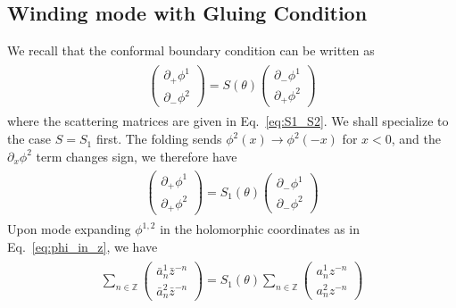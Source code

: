 \subsection{Winding mode with Gluing Condition}
\label{app_sub:compact_gluing_boundary}


We recall that the conformal boundary condition can be written as
\begin{eqnarray}\begin{aligned}
\label{eq:def_S_in_app}
\begin{pmatrix}
\partial_+\phi^1\\
\partial_-\phi^2
\end{pmatrix}
=S(\theta)
\begin{pmatrix}
\partial_-\phi^1\\
\partial_+\phi^2
\end{pmatrix}
\end{aligned}\end{eqnarray}
where the scattering matrices are given in Eq.~\eqref{eq:S1_S2}. We shall specialize to the case $S=S_1$ first. The folding sends $\phi^2(x)\rightarrow\phi^2(-x)$ for $x<0$, and the $\partial_x\phi^2$ term changes sign, we therefore have 
\begin{eqnarray}\begin{aligned}
\label{eq:def_S_in_app_2}
\begin{pmatrix}
\partial_+\phi^1\\
\partial_+\phi^2
\end{pmatrix}
=S_1(\theta)
\begin{pmatrix}
\partial_-\phi^1\\
\partial_-\phi^2
\end{pmatrix}
\end{aligned}\end{eqnarray}
Upon mode expanding $\phi^{1,2}$ in the holomorphic coordinates as in Eq.~\eqref{eq:phi_in_z}, we have
\begin{eqnarray}\begin{aligned}
\label{eq:def_S_in_app_2}
\sum_{n\in\mathbb{Z}}\begin{pmatrix}
\bar{a}_n^1\bar{z}^{-n}\\
\bar{a}_n^2\bar{z}^{-n}
\end{pmatrix}
=S_1(\theta)
\sum_{n\in\mathbb{Z}}
\begin{pmatrix}
a_n^1{z}^{-n}\\
a_n^2{z}^{-n}
\end{pmatrix}
\end{aligned}\end{eqnarray}
